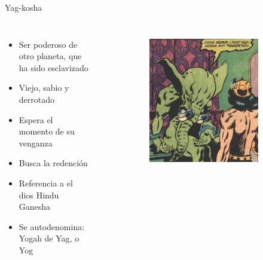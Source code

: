 \begin{frame}{Yag-kosha}
\begin{columns}
\begin{itemize}
 \item Ser poderoso de otro  planeta, que ha sido esclavizado
 \item Viejo, sabio y derrotado
 \item Espera el momento de su venganza
 \item Busca la redención
 \item Referencia a el dios Hindu Ganesha
 \item Se autodenomina: Yogah de Yag, o Yog
\end{itemize}
\begin{figure}[htp]
 \centering
 \begin{subfigure}[b]{0.32\textwidth}
   \includegraphics[width=\textwidth]{img/yogh/CTB}
 \end{subfigure}
~
 \begin{subfigure}[b]{0.32\textwidth}

\end{subfigure}
\end{figure}
\end{columns}
\end{frame}
